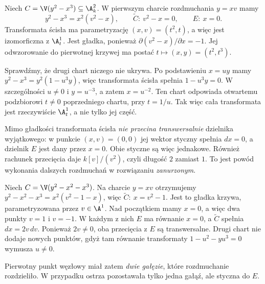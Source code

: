 \begin{przyklad}
\label{prz:ga5-cusp}
Niech $C=\V(y^2-x^3)\subseteq\A^2_k$. W pierwszym
charcie rozdmuchania $y=xv$ mamy
\[
 y^2-x^3=x^2(v^2-x),\qquad
 \widetilde C:\ v^2-x=0,\qquad E:\ x=0.
\]
Transformata ścisła ma parametryzację
$(x,v)=(t^2,t)$, a więc jest izomorficzna z $\A^1_t$.
Jest gładka, ponieważ $\partial(v^2-x)/\partial x=-1$.
Jej odwzorowanie do pierwotnej krzywej ma postać
$t\mapsto(x,y)=(t^2,t^3)$.

Sprawdźmy, że drugi chart niczego nie ukrywa.
Po podstawieniu $x=uy$ mamy
$y^2-x^3=y^2(1-u^3y)$, więc transformata ścisła
spełnia $1-u^3y=0$. W szczególności $u\ne0$ i
$y=u^{-3}$, a zatem $x=u^{-2}$. Ten chart odpowiada
otwartemu podzbiorowi $t\ne0$ poprzedniego chartu,
przy $t=1/u$. Tak więc cała transformata jest
rzeczywiście $\A^1_t$, a nie tylko jej część.

Mimo gładkości transformata ścisła \emph{nie przecina
transwersalnie} dzielnika wyjątkowego: w punkcie
$(x,v)=(0,0)$ jej wektor styczny spełnia $dx=0$,
a dzielnik $E$ jest dany przez $x=0$. Obie styczne
są więc jednakowe. Również rachunek przecięcia
daje $k[v]/(v^2)$, czyli długość $2$ zamiast $1$.
To jest powód wykonania dalszych rozdmuchań
w rozwiązaniu \emph{zanurzonym}.
\end{przyklad}

\begin{przyklad}
\label{prz:ga5-node}
Niech $C=\V(y^2-x^2-x^3)$. Na charcie $y=xv$
otrzymujemy
$y^2-x^2-x^3=x^2(v^2-1-x)$, więc
$\widetilde C:\ x=v^2-1$. Jest to gładka krzywa,
parametryzowana przez $v\in\A^1$.
Nad początkiem mamy $x=0$, a więc dwa punkty
$v=1$ i $v=-1$. W każdym z nich $E$ ma równanie
$x=0$, a $\widetilde C$ spełnia $dx=2v\,dv$.
Ponieważ $2v\ne0$, oba przecięcia z $E$ są
transwersalne. Drugi chart nie dodaje nowych punktów,
gdyż tam równanie transformaty
$1-u^2-yu^3=0$ wymusza $u\ne0$.

Pierwotny punkt węzłowy miał zatem \emph{dwie gałęzie},
które rozdmuchanie rozdzieliło. W przypadku ostrza
pozostawała tylko jedna gałąź, ale styczna do $E$.
\end{przyklad}

